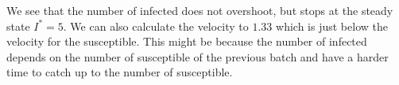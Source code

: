 We see that the number of infected does not overshoot, but stops at the steady state $I^*=5$. We can also calculate the velocity to $1.33$ which is just below the velocity for the susceptible. This might be because the number of infected depends on the number of susceptible of the previous batch and have a harder time to catch up to the number of susceptible.

